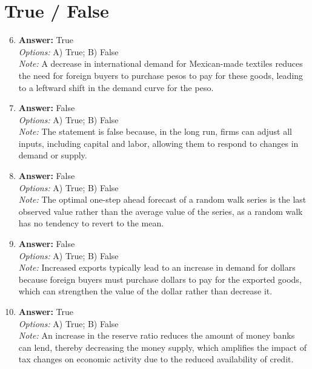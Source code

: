\documentclass[12pt]{article}
\begin{document}
\section*{True / False}
\begin{enumerate}[label=\arabic*.]
\setcounter{enumi}{5}
\item \textbf{Answer:} True
\\ \textit{Options:} A) True; B) False
\\ \textit{Note:} A decrease in international demand for Mexican-made textiles reduces the need for foreign buyers to purchase pesos to pay for these goods, leading to a leftward shift in the demand curve for the peso.
\item \textbf{Answer:} False
\\ \textit{Options:} A) True; B) False
\\ \textit{Note:} The statement is false because, in the long run, firms can adjust all inputs, including capital and labor, allowing them to respond to changes in demand or supply.
\item \textbf{Answer:} False
\\ \textit{Options:} A) True; B) False
\\ \textit{Note:} The optimal one-step ahead forecast of a random walk series is the last observed value rather than the average value of the series, as a random walk has no tendency to revert to the mean.
\item \textbf{Answer:} False
\\ \textit{Options:} A) True; B) False
\\ \textit{Note:} Increased exports typically lead to an increase in demand for dollars because foreign buyers must purchase dollars to pay for the exported goods, which can strengthen the value of the dollar rather than decrease it.
\item \textbf{Answer:} True
\\ \textit{Options:} A) True; B) False
\\ \textit{Note:} An increase in the reserve ratio reduces the amount of money banks can lend, thereby decreasing the money supply, which amplifies the impact of tax changes on economic activity due to the reduced availability of credit.
\end{enumerate}
\end{document}
